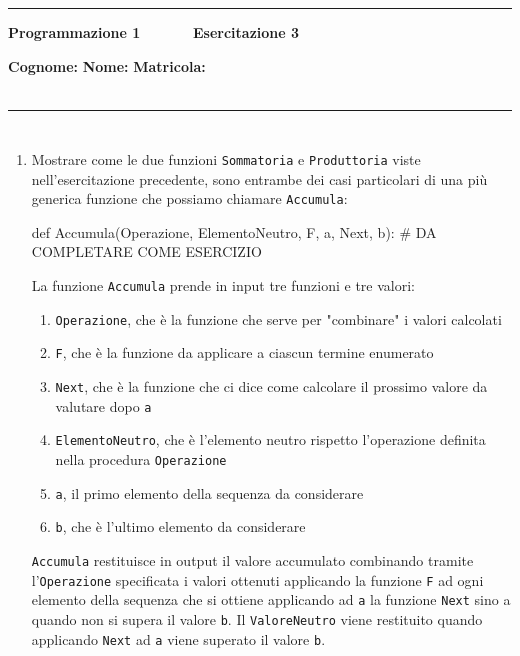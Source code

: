\documentclass[11pt,a4]{article}
\begin{document}
\thispagestyle{empty}
\hrule
\begin{center}
   {\Large {\bf Programmazione 1 \hspace{3cm} $\quad \quad \quad$ Esercitazione 3}}
\end{center}
{\bf Cognome: }\hspace{2.5cm} {\bf Nome: } \hspace{2.5cm} {\bf Matricola: } \\\
\hrule

\section*{}
\begin{enumerate}

\item Mostrare come le due funzioni {\tt Sommatoria} e {\tt Produttoria} viste nell'esercitazione precedente, sono
entrambe dei casi particolari di una più generica funzione che possiamo chiamare {\tt Accumula}:
\begin{python}
def Accumula(Operazione, ElementoNeutro, F, a, Next, b):
    # DA COMPLETARE COME ESERCIZIO
\end{python}
La funzione {\tt Accumula} prende in input tre funzioni e tre valori:
\begin{enumerate}
\item {\tt Operazione}, che è la funzione che serve per "combinare" i valori calcolati
\item {\tt F}, che è la funzione da applicare a ciascun termine enumerato
\item {\tt Next}, che è la funzione che ci dice come calcolare il prossimo valore da valutare dopo {\tt a}
\item {\tt ElementoNeutro}, che è l'elemento neutro rispetto l'operazione definita nella procedura {\tt Operazione}
\item {\tt a}, il primo elemento della sequenza da considerare
\item {\tt b}, che è l'ultimo elemento da considerare 
\end{enumerate}
{\tt Accumula} restituisce in output il valore accumulato combinando tramite l'{\tt Operazione} specificata i valori ottenuti
applicando la funzione {\tt F} ad ogni elemento della sequenza che si ottiene
applicando ad {\tt a} la funzione {\tt Next} sino a quando non si supera il valore {\tt b}.
Il {\tt ValoreNeutro} viene restituito quando applicando {\tt Next} ad {\tt a} viene superato il valore {\tt b}.


\end{enumerate}
\end{document}
